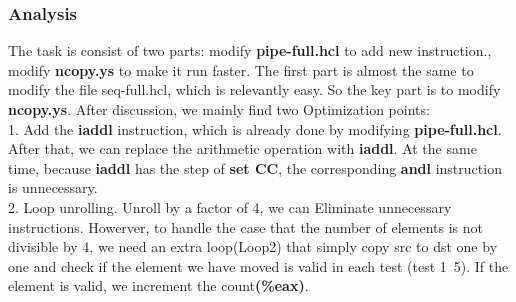 \documentclass{article}
\begin{document}
\subsubsection{Analysis}

The task is consist of two parts: modify \textbf{pipe-full.hcl} to add new instruction., modify \textbf{ncopy.ys} to make it run faster. The first part is almost the same to modify the file seq-full.hcl, which is relevantly easy. So the key part is to modify \textbf{ncopy.ys}. After discussion, we mainly find two Optimization points:\\
1. Add the \textbf{iaddl} instruction, which is already done by modifying \textbf{pipe-full.hcl}. After that, we can replace the arithmetic operation with \textbf{iaddl}. At the same time, because \textbf{iaddl} has the step of \textbf{set CC}, the corresponding \textbf{andl} instruction is unnecessary.\\
2. Loop unrolling. Unroll by a factor of 4, we can Eliminate unnecessary instructions. Howerver, to handle the case that the number of elements is not divisible by 4, we need an extra loop(Loop2) that simply copy src to dst one by one and check if the element we have moved is valid in each test (test 1~5). If the element is valid, we increment the count\textbf{(\%eax)}.
\end{document}
